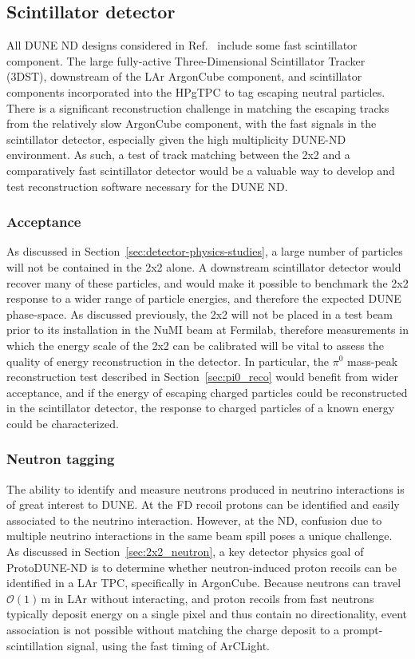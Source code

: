 \subsection{Scintillator detector}
\label{sec:minerva}
All DUNE ND designs considered in Ref.~\cite{dune_ndcsg} include some fast scintillator component. The large fully-active Three-Dimensional Scintillator Tracker (3DST), downstream of the LAr ArgonCube component, and scintillator components incorporated into the HPgTPC to tag escaping neutral particles. 
There is a significant reconstruction challenge in matching the escaping tracks from the relatively slow ArgonCube component, with the fast signals in the scintillator detector, especially given the high multiplicity DUNE-ND environment. 
As such, a test of track matching between the 2x2 and a comparatively fast scintillator detector would be a valuable way to develop and test reconstruction software necessary for the DUNE ND.


\subsubsection{Acceptance}
As discussed in Section~\ref{sec:detector-physics-studies}, a large number of particles will not be contained in the 2x2 alone. A downstream scintillator detector would recover many of these particles, and would make it possible to benchmark the 2x2 response to a wider range of particle energies, and therefore the expected DUNE phase-space. As discussed previously, the 2x2 will not be placed in a test beam prior to its installation in the NuMI beam at Fermilab, therefore measurements in which the energy scale of the 2x2 can be calibrated will be vital to assess the quality of energy reconstruction in the detector. In particular, the $\pi^{0}$ mass-peak reconstruction test described in Section~\ref{sec:pi0_reco} would benefit from wider acceptance, and if the energy of escaping charged particles could be reconstructed in the scintillator detector, the response to charged particles of a known energy could be characterized.

\subsubsection{Neutron tagging}
The ability to identify and measure neutrons produced in neutrino interactions is of great interest to DUNE.  At the FD recoil protons can be identified and easily associated to the neutrino interaction.  However, at the ND, confusion due to multiple neutrino interactions in the same beam spill poses a unique challenge.  As discussed in Section~\ref{sec:2x2_neutron}, a key detector physics goal of ProtoDUNE-ND is to determine whether neutron-induced proton recoils can be identified in a LAr TPC, specifically in ArgonCube. Because neutrons can travel $\mathcal{O}\left(1\right)\,\mathrm{m}$ in LAr without interacting, and proton recoils from fast neutrons typically deposit energy on a single pixel and thus contain no directionality, event association is not possible without matching the charge deposit to a prompt-scintillation signal, using the fast timing of ArCLight.
 

